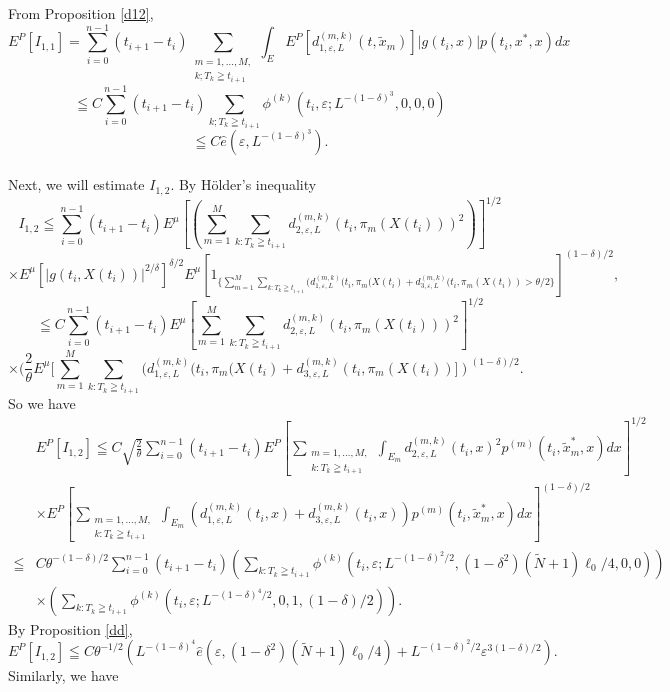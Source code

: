 \documentclass[12pt]{article}
\begin{document}
From Proposition \ref{d12},
$$
E^P[I_{1,1}]=\sum_{i=0}^{n-1} (t_{i+1}-t_i) \sum_{\substack{m=1,\ldots,M,\\ k; T_k \geqq t_{i+1}} } \int_{E} E^P[d_{1,\varepsilon,L}^{(m,k)}(t,\tilde{x}_m) ]
|g(t_i,x)| p(t_i, x^*, x)dx 
$$
$$
\leqq C\sum_{i=0}^{n-1} (t_{i+1}-t_i) \sum_{k; T_k \geqq t_{i+1}}  \phi^{(k)}(t_i,\varepsilon; L^{-(1-\delta)^3}, 0,0, 0)$$
$$
\leqq C\hat{e}\left(\varepsilon,L^{-(1-\delta)^3}\right).
$$
\\
Next, we will estimate $I_{1,2}$.  By H\"{o}lder's inequality
$$I_{1,2}\leqq 
 \sum_{i=0}^{n-1}(t_{i+1}-t_i)   E ^{\mu}[(\sum_{m=1}^M \sum_{k:T_k\geqq t_{i+1} } d_{2,\varepsilon,L}^{(m, k)}(t_i, \pi_m (X(t_i)))^2)]^{1/2} 
 $$
 $$
\times E^{\mu}[|g(t_i,X(t_i))|^{2/\delta}]^{\delta/2}E^{\mu}[1_{\{\sum_{m=1}^M \sum_{k:T_k\geqq t_{i+1} } (d_{1,\varepsilon,L}^{(m,k)}(t_i, \pi_m(X(t_i) + d_{3,\varepsilon,L}^{(m,k)}(t_i, \pi_m (X(t_i) ) > \theta/2\}}]^{(1-\delta)/2},$$
$$
 \leqq C\sum_{i=0}^{n-1}(t_{i+1}-t_i)  E ^{\mu}[\sum_{m=1}^M \sum_{k:T_k\geqq t_{i+1} } d_{2,\varepsilon,L}^{(m,k)}(t_i, \pi_m (X(t_i)))^2]^{1/2} 
 $$
 $$
\times (\frac{2}{\theta} E^{\mu}[\sum_{m=1}^M \sum_{k:T_k\geqq t_{i+1} } (d_{1,\varepsilon,L}^{(m, k)}(t_i, \pi_m (X(t_i)+ d_{3,\varepsilon,L}^{(m, k)}(t_i, \pi_m (X(t_i)) ])^{(1-\delta)/2}.$$
So we have
\begin{align*}
&E^P[ I_{1,2}] \leqq  C\sqrt{\frac{2}{\theta}} \sum_{i=0}^{n-1}(t_{i+1}-t_i)  
E^P[\sum_{\substack{m=1,\ldots,M,\\k:T_k\geqq t_{i+1}} }  \int_{E_m} d_{2,\varepsilon,L}^{(m,k)}(t_i, x)^2 p^{(m)}(t_i, \tilde{x}_m^*, x)dx ]^{1/2}\\
&\times E^P[ \sum_{\substack{m=1,\ldots,M,\\k:T_k\geqq t_{i+1}} } \int_{E_m} (d_{1,\varepsilon,L}^{(m,k)}(t_i, x) + d_{3,\varepsilon,L}^{(m,k)}(t_i, x)) p^{(m)}(t_i, \tilde{x}_m^*, x)dx ]^{(1-\delta)/2}\\
\leqq &C \theta^{-(1-\delta)/2} \sum_{i=0}^{n-1}(t_{i+1}-t_i)  \left( \sum_{k:T_k\geqq t_{i+1} } \phi^{(k)}(t_i, \varepsilon; L^{-(1-\delta)^2/2}, (1-\delta^2)(\tilde{N}+1)\ell_0/4, 0, 0)\right) \\
&\times \left(\sum_{k:T_k\geqq t_{i+1} } \phi^{(k)}(t_i, \varepsilon; L^{-(1-\delta)^4/2}, 0, 1, (1-\delta)/2)\right).
\end{align*}
By Proposition \ref{dd},
$$
E^P[ I_{1,2}]\leqq C\theta^{-1/2}  \left( L^{-(1-\delta)^4} \hat{e}\left(\varepsilon, (1-\delta^2)(\tilde{N}+1)\ell_0/4\right)
+ L^{-(1-\delta)^2/2}\varepsilon^{3(1-\delta)/2} \right).
$$
Similarly, we have 
\end{document}
